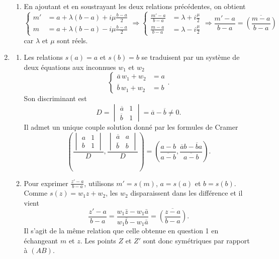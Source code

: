 \begin{enumerate}
\begin{enumerate}
   \item En ajoutant et en soustrayant les deux relations précédentes, on obtient
\[
\left\lbrace  
\begin{aligned}
  m' &= a + \lambda(b-a) + i \mu \frac{b-a}{2} \\
  m  &= a + \lambda(b-a) - i \mu \frac{b-a}{2}
\end{aligned} \right.
\Rightarrow
\left\lbrace 
\begin{aligned}
  \frac{m'-a}{b-a} &= \lambda + i  \frac{\mu}{2} \\
  \frac{m-a}{b-a}  &= \lambda - i \frac{\mu}{2}
\end{aligned} \right.
\Rightarrow \frac{m'-a}{b-a} = \overline{\left(\frac{m-a}{b-a}\right)}
\]
car $\lambda$ et $\mu$ sont réels.
 \end{enumerate}
 \item
 \begin{enumerate}
   \item Les relations $s(a)=a$ et $s(b)=b$ se traduisent par un système de deux équations aux inconnues $w_1$ et $w_2$
\[
  \left\lbrace
  \begin{aligned}
    \overline{a}\, w_1 + w_2 &= a \\ \overline{b}\,w_1 + w_2 &= b
  \end{aligned}
\right. .
\]
Son discriminant est
\[
  D = 
  \begin{vmatrix}
    \overline{a} & 1 \\ \overline{b} & 1
  \end{vmatrix}
= \overline{a} - \overline{b} \neq 0.
\]
Il admet un unique couple solution donné par les formules de Cramer
\[
  ( 
  \frac{
    \begin{vmatrix}
      a & 1 \\ b & 1
    \end{vmatrix}
  }{D} , 
  \frac{
    \begin{vmatrix}
      \overline{a} & a \\ \overline{b} & b
    \end{vmatrix}
  }{D} )
  = (\frac{a - b}{\overline{a - b}}, \frac{\overline{a}b - \overline{b}a}{\overline{a - b}}).
\]

   \item Pour exprimer $\frac{z' - a}{b -a}$, utilisons $m'=s(m)$, $a=s(a)$ et $b=s(b)$. \newline
   Comme $s(z) = w_1z + w_2$, les $w_2$ disparaissent dans les différence et il vient
\[
  \frac{z' - a}{b -a} = \frac{w_1 \bar{z} - w_1\bar{a}}{w_1 \bar{b} - w_1\bar{a}} = \overline{\left( \frac{z-a}{b-a}\right)}.
\]
Il s'agit de la même relation que celle obtenue en question 1 en échangeant $m$ et $z$. Les points $Z$ et $Z'$ sont donc symétriques par rapport à $(AB)$.
 \end{enumerate}
\end{enumerate}

